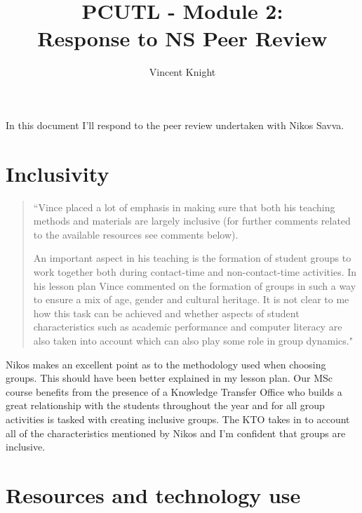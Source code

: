 \documentclass[a4paper,12pt]{article}
\title{PCUTL - Module 2:\\ Response to NS Peer Review}
\author{Vincent Knight}
\date{}
\begin{document}
\maketitle

In this document I'll respond to the peer review undertaken with Nikos Savva.


\section{Inclusivity}

\begin{quote}
``Vince placed a lot of emphasis in making sure that both his teaching methods and materials are largely inclusive (for further comments related to the available resources see comments below).

An important aspect in his teaching is the formation of student groups to work together both during contact-time and non-contact-time activities. In his lesson plan Vince commented on the formation of groups in such a way to ensure a mix of age, gender and cultural heritage. It is not clear to me how this task can be achieved and whether aspects of student characteristics such as academic performance and computer literacy are also taken into account which can also play some role in group dynamics."
\end{quote}

Nikos makes an excellent point as to the methodology used when choosing groups. This should have been better explained in my lesson plan. Our MSc course benefits from the presence of a Knowledge Transfer Office who builds a great relationship with the students throughout the year and for all group activities is tasked with creating inclusive groups. The KTO takes in to account all of the characteristics mentioned by Nikos and I'm confident that groups are inclusive.

\section{Resources and technology use}
\end{document}
